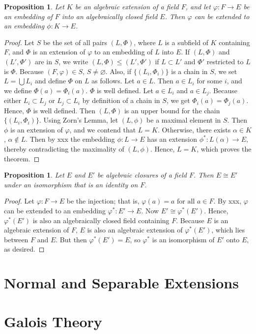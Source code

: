 \documentclass[draft]{article}
\newtheorem{prop}[thm]{Proposition}
\theoremstyle{definition}
\theoremstyle{remark}
\begin{document}
            \begin{prop}
                Let $K$ be an algebraic extension of a field $F$, and let $\varphi: F \to E$ be an embedding of $F$ into an algebraically closed field $E$. Then $\varphi$ can be extended to an embedding $\phi: K \to E$.
            \end{prop}
            
            \begin{proof}
                Let $S$ be the set of all pairs $(L, \Phi)$, where $L$ is a subfield of $K$ containing $F$, and $\Phi$ is an extension of $\varphi$ to an embedding of $L$ into $E$. If $(L, \Phi)$ and $(L', \Phi')$ are in $S$, we write $(L, \Phi) \leq (L', \Phi')$ if $L \subset L'$ and $\Phi'$ restricted to $L$ is $\Phi$. Because $(F, \varphi) \in S$, $S \neq \varnothing$. Also, if $\{(L_i, \Phi_i)\}$ is a chain in $S$, we set $L = \bigcup L_i$ and define $\Phi$ on $L$ as follows. Let $a \in L$. Then $a \in L_i$ for some $i$, and we define $\Phi(a) = \Phi_i(a)$. $\Phi$ is well defined. Let $a \in L_i$ and $a \in L_j$. Because either $L_i \subset L_j$ or $L_j \subset L_i$ by definition of a chain in $S$, we get $\Phi_i(a) = \Phi_j(a)$. Hence, $\Phi$ is well defined. Then $(L, \Phi)$ is an upper bound for the chain $\{(L_i, \Phi_i)\}$. Using Zorn's Lemma, let $(L, \phi)$ be a maximal element in $S$. Then $\phi$ is an extension of $\varphi$, and we contend that $L = K$. Otherwise, there exists $\alpha \in K$, $\alpha \notin L$. Then by xxx the embedding $\phi: L \to E$ has an extension $\phi^{*}: L(\alpha) \to E$, thereby contradicting the maximality of $(L, \phi)$. Hence, $L = K$, which proves the theorem.
            \end{proof}
            
            \begin{prop}
                Let $E$ and $E'$ be algebraic closures of a field $F$. Then $E \cong E'$ under an isomorphism that is an identity on $F$.
            \end{prop}
            
            \begin{proof}
                Let $\varphi: F \to E$ be the injection; that is, $\varphi(a) = a \text{ for all } a \in F$. By xxx, $\varphi$ can be extended to an embedding $\varphi^{*}: E' \to E$. Now $E' \cong \varphi^{*}(E')$. Hence, $\varphi^{*}(E')$ is also an algebraically closed field containing $F$. Because $E$ is an algebraic extension of $F$, $E$ is also an algebraic extension of $\varphi^{*}(E')$, which lies between $F$ and $E$. But then $\varphi^{*}(E') = E$, so $\varphi^{*}$ is an isomorphism of $E'$ onto $E$, as desired.
            \end{proof}
            
	\section{Normal and Separable Extensions}
	
	\section{Galois Theory}
	
\newpage

    \begin{thebibliography}{10}
    
    	\bibitem{}
    	
    \end{thebibliography}
	
\end{document}
